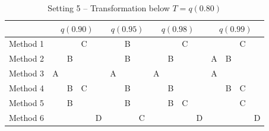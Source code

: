\documentclass[11pt]{article}
\begin{document}
\begin{table}[htbp]
  \centering
  \caption{Setting 5 -- Transformation below $T = q(0.80)$}
  \label{tbl:transsim}
  \begin{tabular}{|l|cccc|ccc|cccc|cccc|}
    \cline{2-16}
    \multicolumn{1}{c}{} & \multicolumn{4}{|c}{$q(0.90)$} & \multicolumn{3}{|c}{$q(0.95)$} & \multicolumn{4}{|c}{$q(0.98)$} & \multicolumn{4}{|c|}{$q(0.99)$} \\
    \hline
    Method 1 &   &   & C &   &   & B &   &   &   & C &   &   &   & C &   \\
    \hline
    Method 2 &   & B &   &   &   & B &   &   & B &   &   & A & B &   &   \\
    \hline
    Method 3 & A &   &   &   & A &   &   & A &   &   &   & A &   &   &   \\
    \hline
    Method 4 &   & B & C &   &   & B &   &   & B &   &   &   & B & C &   \\
    \hline
    Method 5 &   & B &   &   &   & B &   &   & B & C &   &   &   & C &   \\
    \hline
    Method 6 &   &   &   & D &   &   & C &   &   &   & D &   &   &   & D \\
    \hline
  \end{tabular}
\end{table}

\begin{singlespace}


\end{singlespace}
\end{document}
